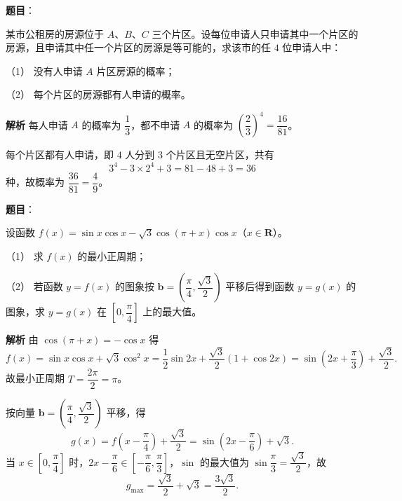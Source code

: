 \begin{answer}

\textbf{题目}：

某市公租房的房源位于 $A$、$B$、$C$ 三个片区。设每位申请人只申请其中一个片区的房源，且申请其中任一个片区的房源是等可能的，求该市的任 $4$ 位申请人中：

（1） 没有人申请 $A$ 片区房源的概率；

（2） 每个片区的房源都有人申请的概率。

\textbf{解析}
每人申请 $A$ 的概率为 $\dfrac13$，都不申请 $A$ 的概率为 $\left(\dfrac23\right)^4=\dfrac{16}{81}$。

每个片区都有人申请，即 $4$ 人分到 $3$ 个片区且无空片区，共有
\nopagebreak[4]
\[3^4-3\times2^4+3=81-48+3=36\]
种，故概率为 $\dfrac{36}{81}=\dfrac49$。



\end{answer}
\begin{answer}

\textbf{题目}：

设函数 $f(x)=\sin x\cos x-\sqrt3\cos(\pi+x)\cos x$（$x\in\mathbf R$）。

（1） 求 $f(x)$ 的最小正周期；

（2） 若函数 $y=f(x)$ 的图象按 $\boldsymbol b=\left(\dfrac\pi4,\dfrac{\sqrt3}2\right)$ 平移后得到函数 $y=g(x)$ 的图象，求 $y=g(x)$ 在 $\left[0,\dfrac\pi4\right]$ 上的最大值。

\textbf{解析}
由 $\cos(\pi+x)=-\cos x$ 得
\nopagebreak[4]
\[f(x)=\sin x\cos x+\sqrt3\cos^2x=\frac12\sin2x+\frac{\sqrt3}2(1+\cos2x)
=\sin\left(2x+\frac\pi3\right)+\frac{\sqrt3}2.\]
故最小正周期 $T=\dfrac{2\pi}2=\pi$。

按向量 $\boldsymbol b=\left(\dfrac\pi4,\dfrac{\sqrt3}2\right)$ 平移，得
\nopagebreak[4]
\[g(x)=f\left(x-\frac\pi4\right)+\frac{\sqrt3}2=\sin\left(2x-\frac\pi6\right)+\sqrt3.\]
当 $x\in\left[0,\dfrac\pi4\right]$ 时，$2x-\dfrac\pi6\in\left[-\dfrac\pi6,\dfrac\pi3\right]$，$\sin$ 的最大值为 $\sin\dfrac\pi3=\dfrac{\sqrt3}2$，故
\nopagebreak[4]
\[g_{\max}=\frac{\sqrt3}2+\sqrt3=\frac{3\sqrt3}2.\]



\end{answer}
